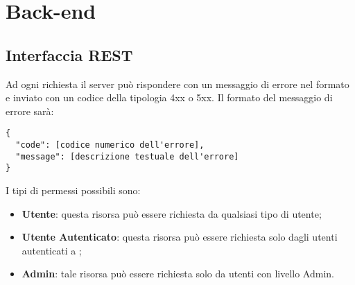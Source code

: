 \section{Back-end}


\subsection{Interfaccia REST}

Ad ogni richiesta il server può rispondere con un messaggio di errore nel formato  e inviato con un codice  della tipologia 4xx o 5xx. 
Il formato  del messaggio di errore sarà:
\begin{lstlisting}
{ 
  "code": [codice numerico dell'errore],
  "message": [descrizione testuale dell'errore]
}
\end{lstlisting}
I tipi di permessi possibili sono: 
\begin{itemize}
\item \textbf{Utente}: questa risorsa può essere richiesta da qualsiasi tipo di utente;
\item \textbf{Utente Autenticato}: questa risorsa può essere richiesta solo dagli utenti autenticati a ;
\item \textbf{Admin}: tale risorsa può essere richiesta solo da utenti con livello Admin.
\end{itemize}

